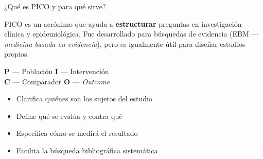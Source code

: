 \documentclass[12pt, aspectratio=169]{beamer}
\begin{document}
\begin{frame}{¿Qué es PICO y para qué sirve?}
  \begin{keybox}
    \small
    PICO es un acrónimo que ayuda a \textbf{estructurar} preguntas en
    investigación clínica y epidemiológica.
    Fue desarrollado para búsquedas de evidencia
    (EBM — \textit{medicina basada en evidencia}),
    pero es igualmente útil para diseñar estudios propios.
    \vspace{2pt}
    \begin{flushright}
      \scriptsize\textit{\parencite{Hosseini2024_formulating,Covvey2024_basics}}
    \end{flushright}
  \end{keybox}

  \smallskip
  \begin{center}
    \normalsize
    \textbf{P} — Población \qquad \textbf{I} — Intervención \\[2pt]
    \textbf{C} — Comparador \qquad \textbf{O} — \textit{Outcome}
  \end{center}

  \smallskip
  \begin{itemize}
    \item Clarifica quiénes son los sujetos del estudio
    \item Define qué se evalúa y contra qué
    \item Especifica cómo se medirá el resultado
    \item Facilita la búsqueda bibliográfica sistemática
  \end{itemize}

\end{frame}
\end{document}
